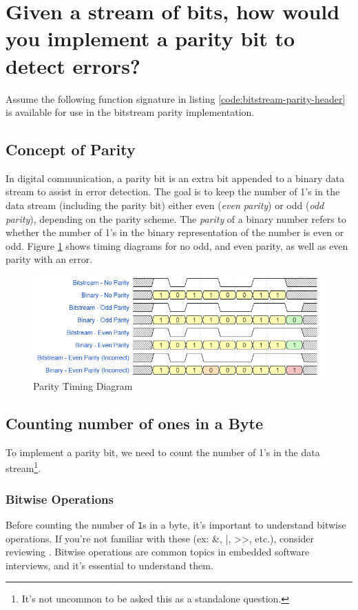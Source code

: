 \documentclass[main.tex]{subfiles}
\begin{document}
\section{Given a stream of bits, how would you implement a parity bit to detect errors?}
Assume the following function signature in listing \ref{code:bitstream-parity-header} is available for use in the bitstream parity implementation. 



\spoilerline
\subsection{Concept of Parity}
In digital communication, a parity bit is an extra bit appended to a binary data stream to assist in error detection. The goal is to keep the number of 1's in the data stream (including the parity bit) either even (\textit{even parity}) or odd (\textit{odd parity}), depending on the parity scheme. The \textit{parity} of a binary number refers to whether the number of 1's in the binary representation of the number is even or odd. Figure \ref{fig:parity-timing-dagiram} shows timing diagrams for no odd, and even parity, as well as even parity with an error. 

\begin{figure}[H]
    \centering
    \includegraphics[scale=0.5]{images/parity.png}
    \caption{Parity Timing Diagram}
    \label{fig:parity-timing-dagiram}
\end{figure}

\subsection {Counting number of ones in a Byte}
To implement a parity bit, we need to count the number of 1's in the data stream\footnote{It's not uncommon to be asked this as a standalone question.}. 
\subsubsection{Bitwise Operations}
Before counting the number of \texttt{1}s in a byte, it’s important to understand bitwise operations. If you’re not familiar with these (ex: \&, |, >>, etc.), consider reviewing . Bitwise operations are common topics in embedded software interviews, and it's essential to understand them.
\end{document}
